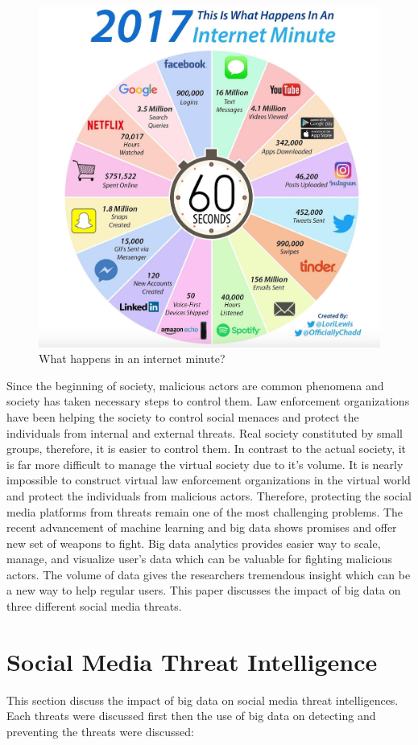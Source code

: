 \documentclass[sigconf]{acmart}
\begin{document}
\begin{figure}[!ht]
 \centering\includegraphics[width=0.5\columnwidth]{images/one-internet-minute.png}
  \caption{What happens in an internet minute?~\cite{social-media2}}\label{f:socialmedia}
\end{figure}

Since the beginning of society, malicious actors are common phenomena and society has taken necessary steps to control them. Law enforcement organizations have been helping the society to control social menaces and protect the individuals from internal and external threats.  Real society constituted by small groups, therefore, it is easier to control  them. In contrast to the actual society, it is far more difficult to manage the virtual society due to it's volume. It is nearly impossible to construct virtual law enforcement organizations in the virtual world and protect the individuals from malicious actors. Therefore, protecting the social media platforms from threats remain one of the most challenging problems. The recent advancement of machine learning and big data shows promises and offer new set of weapons to fight. Big data analytics provides easier way to scale, manage, and visualize user's data which can be valuable for fighting malicious actors. The volume of data gives the researchers tremendous insight which can be a new way to help regular users. This paper discusses the impact of big data on three different social media threats.

\section{Social Media Threat Intelligence}
This section discuss the impact of big data on social media threat intelligences. Each threats were discussed first then the use of big data on detecting and preventing the threats were discussed:
\end{document}
